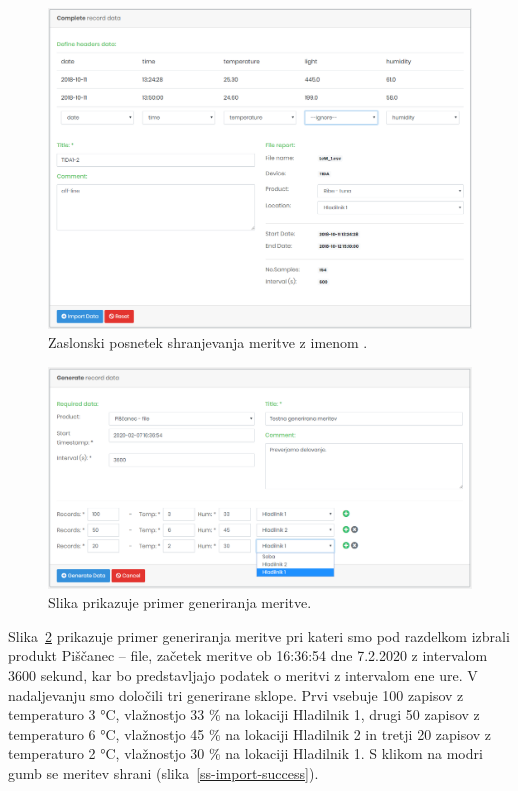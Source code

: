 \documentclass[a4paper, 12pt]{book}
\begin{document}
\begin{figure}[h]
\begin{center}
\includegraphics[width=\textwidth]{slike/import_data_tida.png}
\end{center}
\caption{Zaslonski posnetek shranjevanja meritve z imenom .}
\label{ss-import-data}
\end{figure}


\begin{figure}[h]
\begin{center}
\includegraphics[width=\textwidth]{slike/generate_data.png}
\end{center}
\caption{Slika prikazuje primer generiranja meritve.}
\label{ss-generate-data}
\end{figure}

Slika~\ref{ss-generate-data} prikazuje primer generiranja meritve pri kateri smo pod razdelkom  izbrali produkt Piščanec – file, začetek meritve ob 16:36:54 dne 7.2.2020 z intervalom 3600 sekund, kar bo predstavljajo podatek o meritvi z intervalom ene ure. V nadaljevanju smo določili tri generirane sklope. Prvi vsebuje 100 zapisov z temperaturo 3 °C, vlažnostjo 33 \% na lokaciji Hladilnik 1, drugi 50 zapisov z temperaturo 6 °C, vlažnostjo 45 \% na lokaciji Hladilnik 2 in tretji 20 zapisov z temperaturo 2 °C, vlažnostjo 30 \% na lokaciji Hladilnik 1. S klikom na modri gumb  se meritev shrani (slika~\ref{ss-import-success}).
\end{document}
